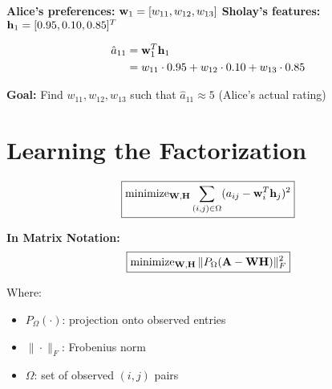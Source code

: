 \documentclass{beamer}
\begin{document}
\begin{frame}\textbf{Alice's preferences:} $\mathbf{w}_1 = [w_{11}, w_{12}, w_{13}]$
\textbf{Sholay's features:} $\mathbf{h}_1 = [0.95, 0.10, 0.85]^T$

\pause
\begin{align}
\hat{a}_{11} &= \mathbf{w}_1^T \mathbf{h}_1 \\
&= w_{11} \cdot 0.95 + w_{12} \cdot 0.10 + w_{13} \cdot 0.85
\end{align}

\pause
\textbf{Goal:} Find $w_{11}, w_{12}, w_{13}$ such that $\hat{a}_{11} \approx 5$ (Alice's actual rating)
\end{frame}


\section{Learning the Factorization}

\begin{frame}\begin{equation*}
\boxed{\operatorname{minimize}_{\mathbf{W},\mathbf{H}} \sum_{(i,j) \in \Omega} (a_{ij} - \mathbf{w}_i^T \mathbf{h}_j)^2}
\end{equation*}

\pause
\textbf{In Matrix Notation:}
\begin{equation*}
\boxed{\operatorname{minimize}_{\mathbf{W},\mathbf{H}} \|P_\Omega(\mathbf{A} - \mathbf{W}\mathbf{H})\|_F^2}
\end{equation*}

\pause
Where:
\begin{itemize}
\item $P_\Omega(\cdot)$: projection onto observed entries
    \item $\|\cdot\|_F$: Frobenius norm
    \pause
\item $\Omega$: set of observed $(i,j)$ pairs
\end{itemize}
\end{frame}
\end{document}
